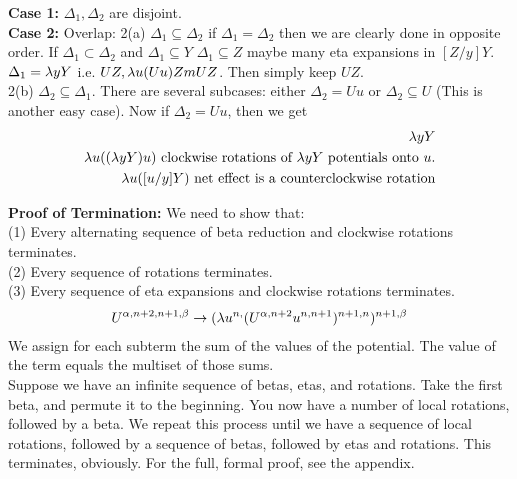 
\textbf{Case 1:} $\Delta_1,\Delta_2$ are disjoint.\\
\textbf{Case 2:} Overlap:
2(a) $\Delta_1 \subseteq \Delta_2$ if $\Delta_1 = \Delta_2$ then we are clearly done in opposite order. If $\Delta_1 \subset \Delta_2$ and $\Delta_1 \subseteq Y$ $\Delta_1 \subseteq Z$ maybe many eta expansions in $[Z/y]Y$. $\Delta_1 = \lambda yY$ i.e. $UZ, \lambda u(Uu)Zm UZ$. Then simply keep $UZ$.\\

2(b) $\Delta_2 \subseteq \Delta_1$. There are several subcases: either $\Delta_2 = Uu$ or $\Delta_2 \subseteq U$ (This is another easy case). Now if $\Delta_2 = Uu$, then we get
\begin{eqnarray*}
  \lambda yY\\
  \lambda u((\lambda yY)u)\hbox{ clockwise rotations of $\lambda yY$ potentials onto $u$.}\\
  \lambda u([u/y]Y)\hbox{ net effect is a counterclockwise rotation}
\end{eqnarray*}

\textbf{Proof of Termination:} %
We need to show that:\\

(1) Every alternating sequence of beta reduction and clockwise rotations terminates.\\

(2) Every sequence of rotations terminates.\\

(3) Every sequence of eta expansions and clockwise rotations terminates.
\begin{eqnarray*}
  U^{\alpha,n+2,n+1,\beta}\rightarrow(\lambda u^{n,}(U^{\alpha,n+2}u^{n,n+1})^{n+1,n})^{n+1,\beta}
\end{eqnarray*}
We assign for each subterm the sum of the values of the potential. The value of the term equals the multiset of those sums.\\

Suppose we have an infinite sequence of betas, etas, and rotations. Take the first beta, and permute it to the beginning. You now have a number of local rotations, followed by a beta. We repeat this process until we have a sequence of local rotations, followed by a sequence of betas, followed by etas and rotations. This terminates, obviously. For the full, formal proof, see the appendix.